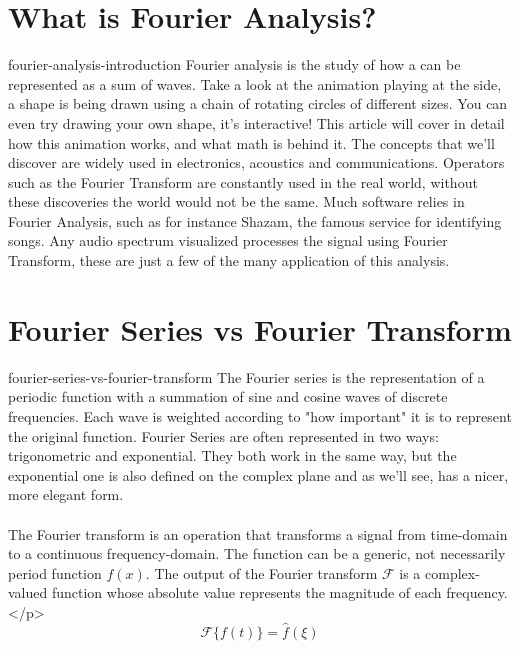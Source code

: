 \documentclass[preview]{standalone}
\begin{document}
\genpage

\section{What is Fourier Analysis?}

\begin{snippet}{fourier-analysis-introduction}
    Fourier analysis is the study of how a \function can be represented as a sum of waves. Take a look at the animation playing at the side, a shape is being drawn using a chain of rotating circles of different sizes. You can even try drawing your own shape, it's interactive! This article will cover in detail how this animation works, and what math is behind it. The concepts that we'll discover are widely used in electronics, acoustics and communications. Operators such as the Fourier Transform are constantly used in the real world, without these discoveries the world would not be the same. Much software relies in Fourier Analysis, such as for instance Shazam, the famous service for identifying songs. Any audio spectrum visualized processes the signal using Fourier Transform, these are just a few of the many application of this analysis.
\end{snippet}


\section{Fourier Series vs Fourier Transform}

\begin{snippet}{fourier-series-vs-fourier-transform}
    The Fourier series is the representation of a periodic function
    with a summation of sine and cosine waves of discrete frequencies. Each wave is weighted
    according to "how important" it is to represent the original function.
    Fourier Series are often represented in two ways: trigonometric and exponential.
    They both work in the same way, but the exponential one is also defined on the
    complex plane and as we'll see, has a nicer, more elegant form.
    \\\\
    The Fourier transform is an operation that transforms a signal
    from time-domain to a continuous frequency-domain. The function can be a generic, not necessarily period function \(f(x)\).
    The output of the Fourier transform \(\mathcal{F}\) is a complex-valued function whose absolute value represents the magnitude of each frequency.</p>
    \[
        \mathcal{F}\{f(t)\}=\hat{f}(\xi)
    \]
\end{snippet}
\end{document}
